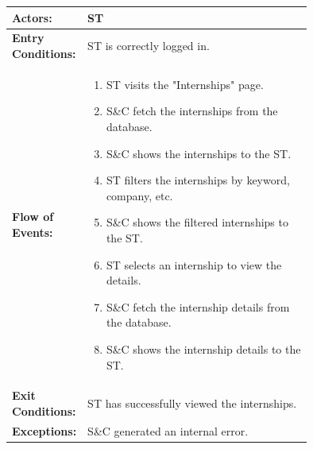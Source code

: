 \begin{center}
    \begin{longtable}{|l|p{0.75\linewidth}|}
        \hline
        \textbf{Actors:}           & ST                                                        \\
        \hline
        \textbf{Entry Conditions:} & ST is correctly logged in.                                \\
        \hline
        \textbf{Flow of Events:}   & \begin{enumerate}
                                         \item ST visits the "Internships" page.
                                         \item S\&C fetch the internships from the database.
                                         \item S\&C shows the internships to the ST.
                                         \item ST filters the internships by keyword, company, etc.
                                         \item S\&C shows the filtered internships to the ST.
                                         \item ST selects an internship to view the details.
                                         \item S\&C fetch the internship details from the database.
                                         \item S\&C shows the internship details to the ST.
                                     \end{enumerate} \\
        \hline
        \textbf{Exit Conditions:}  & ST has successfully viewed the internships.               \\
        \hline
        \textbf{Exceptions:}       & S\&C generated an internal error.                         \\
        \hline
    \end{longtable}
\end{center}

